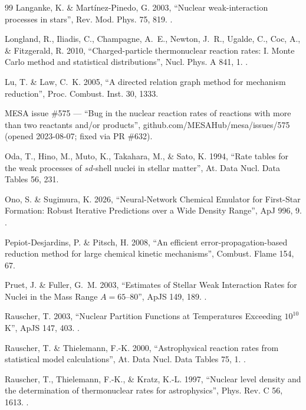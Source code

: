\begin{thebibliography}{99}
Langanke, K. \& Mart\'inez-Pinedo, G. 2003, ``Nuclear weak-interaction
processes in stars'', Rev. Mod. Phys. 75, 819. .

Longland, R., Iliadis, C., Champagne, A.~E., Newton, J.~R., Ugalde, C., Coc,
A., \& Fitzgerald, R. 2010, ``Charged-particle thermonuclear reaction rates: I.
Monte Carlo method and statistical distributions'', Nucl. Phys. A 841, 1.
.

Lu, T. \& Law, C.~K. 2005, ``A directed relation graph method for mechanism
reduction'', Proc. Combust. Inst. 30, 1333.

MESA issue \#575 --- ``Bug in the nuclear reaction rates of reactions with more
than two reactants and/or products'', github.com/MESAHub/mesa/issues/575
(opened 2023-08-07; fixed via PR \#632).

Oda, T., Hino, M., Muto, K., Takahara, M., \& Sato, K. 1994, ``Rate tables for
the weak processes of $sd$-shell nuclei in stellar matter'', At. Data Nucl.
Data Tables 56, 231.

Ono, S. \& Sugimura, K. 2026, ``Neural-Network Chemical Emulator for First-Star
Formation: Robust Iterative Predictions over a Wide Density Range'', ApJ 996,
9. .

Pepiot-Desjardins, P. \& Pitsch, H. 2008, ``An efficient
error-propagation-based reduction method for large chemical kinetic
mechanisms'', Combust. Flame 154, 67.

Pruet, J. \& Fuller, G.~M. 2003, ``Estimates of Stellar Weak Interaction Rates
for Nuclei in the Mass Range $A = 65$--80'', ApJS 149, 189.
.

Rauscher, T. 2003, ``Nuclear Partition Functions at Temperatures Exceeding
$10^{10}$\,K'', ApJS 147, 403. .

Rauscher, T. \& Thielemann, F.-K. 2000, ``Astrophysical reaction rates from
statistical model calculations'', At. Data Nucl. Data Tables 75, 1.
.

Rauscher, T., Thielemann, F.-K., \& Kratz, K.-L. 1997, ``Nuclear level density
and the determination of thermonuclear rates for astrophysics'', Phys. Rev. C
56, 1613. .


\end{thebibliography}
